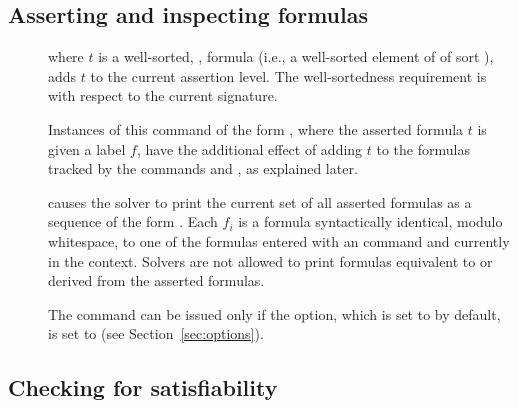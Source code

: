 \subsection{Asserting and inspecting formulas} \label{sec:assert}

\begin{description}
%
\item[]
where $t$ is a well-sorted, , formula 
(i.e., a well-sorted element of  of sort ),
adds $t$ to the current assertion level.
The well-sortedness requirement is with respect to the current signature.

Instances of this command of the form , 
where the asserted formula $t$ is given a label $f$, 
have the additional effect of adding $t$ to the formulas tracked 
by the commands  and , as explained later.
\smallskip

%
\item[]
causes the solver to print the current set of all asserted formulas
as a sequence of the form .
Each $f_i$ is a formula syntactically identical, modulo whitespace, 
to one of the formulas entered with an  command and 
currently in the context.
Solvers are not allowed to print formulas equivalent to or derived from 
the asserted formulas.

The command can be issued only if the  option,
which is set to  by default, is set to  
(see Section~\ref{sec:options}).

\end{description}


\subsection{Checking for satisfiability} \label{sec:checking-for-sat}

